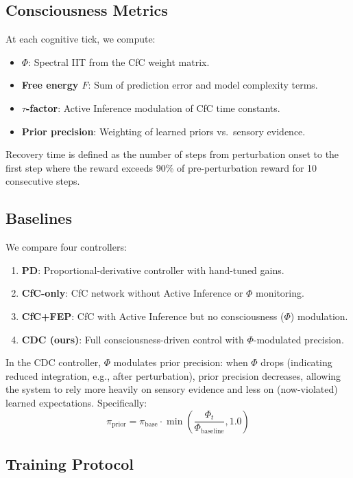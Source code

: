 \documentclass[11pt,a4paper]{article}
\begin{document}
\subsection{Consciousness Metrics}

At each cognitive tick, we compute:
\begin{itemize}
  \item \textbf{$\Phi$}: Spectral IIT from the CfC weight matrix.
  \item \textbf{Free energy $F$}: Sum of prediction error and model complexity terms.
  \item \textbf{$\tau$-factor}: Active Inference modulation of CfC time constants.
  \item \textbf{Prior precision}: Weighting of learned priors vs.\ sensory evidence.
\end{itemize}

Recovery time is defined as the number of steps from perturbation onset to the first step where the reward exceeds 90\% of pre-perturbation reward for 10 consecutive steps.

\subsection{Baselines}

We compare four controllers:
\begin{enumerate}
  \item \textbf{PD}: Proportional-derivative controller with hand-tuned gains.
  \item \textbf{CfC-only}: CfC network without Active Inference or $\Phi$ monitoring.
  \item \textbf{CfC+FEP}: CfC with Active Inference but no consciousness ($\Phi$) modulation.
  \item \textbf{CDC (ours)}: Full consciousness-driven control with $\Phi$-modulated precision.
\end{enumerate}

In the CDC controller, $\Phi$ modulates prior precision: when $\Phi$ drops (indicating reduced integration, e.g., after perturbation), prior precision decreases, allowing the system to rely more heavily on sensory evidence and less on (now-violated) learned expectations.
Specifically:
\[
\pi_{\text{prior}} = \pi_{\text{base}} \cdot \min\left(\frac{\Phi_t}{\Phi_{\text{baseline}}}, 1.0\right)
\]

\subsection{Training Protocol}
\end{document}
